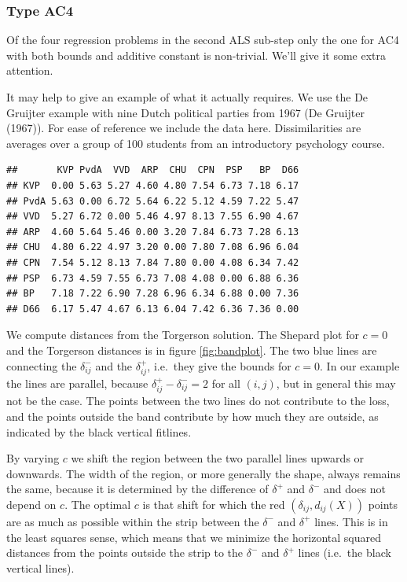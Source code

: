 \documentclass[
  12pt,
]{article}
\begin{document}
\subsubsection{Type AC4}\label{type-ac4}

Of the four regression problems in the second ALS sub-step only the one for AC4 with both bounds and additive constant is non-trivial. We'll give it some extra attention.

It may help to give an example of what it actually requires. We use the De Gruijter example
with nine Dutch political parties from 1967 (De Gruijter (1967)). For ease of reference we include the data here. Dissimilarities are averages over a group of 100 students from an introductory psychology course.

\begin{verbatim}
##       KVP PvdA  VVD  ARP  CHU  CPN  PSP   BP  D66
## KVP  0.00 5.63 5.27 4.60 4.80 7.54 6.73 7.18 6.17
## PvdA 5.63 0.00 6.72 5.64 6.22 5.12 4.59 7.22 5.47
## VVD  5.27 6.72 0.00 5.46 4.97 8.13 7.55 6.90 4.67
## ARP  4.60 5.64 5.46 0.00 3.20 7.84 6.73 7.28 6.13
## CHU  4.80 6.22 4.97 3.20 0.00 7.80 7.08 6.96 6.04
## CPN  7.54 5.12 8.13 7.84 7.80 0.00 4.08 6.34 7.42
## PSP  6.73 4.59 7.55 6.73 7.08 4.08 0.00 6.88 6.36
## BP   7.18 7.22 6.90 7.28 6.96 6.34 6.88 0.00 7.36
## D66  6.17 5.47 4.67 6.13 6.04 7.42 6.36 7.36 0.00
\end{verbatim}

We compute distances from the Torgerson solution. The Shepard plot for \(c=0\) and the Torgerson distances is in figure \ref{fig:bandplot}. The two blue
lines are connecting the \(\delta_{ij}^-\) and the \(\delta_{ij}^+\), i.e.~they give
the bounds for \(c=0\). In our example the lines are parallel, because \(\delta_{ij}^+-\delta_{ij}^-=2\) for all \((i,j)\), but in general this may not be the case.
The points between the two lines do not contribute to the loss, and
the points outside the band contribute by how much they are outside, as indicated by the
black vertical fitlines.

By varying \(c\) we shift the region between the two parallel lines upwards or downwards. The width of the region, or more generally the shape, always remains the same, because it is determined by the difference of \(\delta^+\) and \(\delta^-\) and does not depend on \(c\). The
optimal \(c\) is that shift for which the red \((\delta_{ij},d_{ij}(X))\) points are as much as possible within the strip between the \(\delta^-\) and \(\delta^+\) lines. This is in the least squares sense, which means that we minimize the horizontal squared distances from the points outside the strip to the \(\delta^-\) and \(\delta^+\) lines (i.e.~the black vertical lines).
\end{document}
